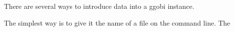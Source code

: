 There are several ways to introduce data into a ggobi instance.
\begin{description}
\item[Command Line]
\item[File Menu]
\item
\end{description}
The simplest way is to give it the name of a file
on the command line. The 


